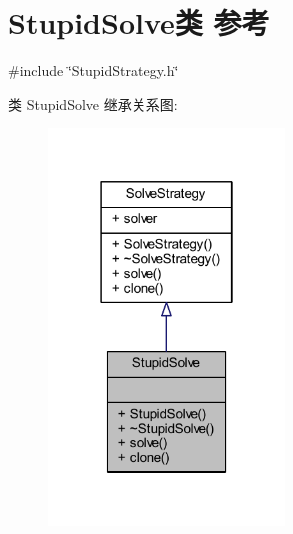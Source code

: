 \hypertarget{classStupidSolve}{}\section{Stupid\+Solve类 参考}
\label{classStupidSolve}


{\ttfamily \#include \char`\"{}Stupid\+Strategy.\+h\char`\"{}}



类 Stupid\+Solve 继承关系图\+:
\nopagebreak
\begin{figure}[H]
\begin{center}
\leavevmode
\includegraphics[width=178pt]{classStupidSolve__inherit__graph}
\end{center}
\end{figure}


